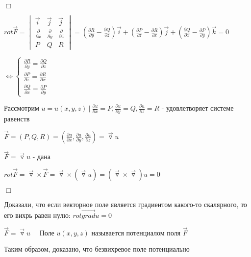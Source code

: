 \documentclass[12pt]{article}
\begin{document}
    $\Box$ \fbox{\Longrightarrow}

    $rot \overrightarrow{F} =
    \begin{vmatrix}
        \overrightarrow{i}          & \overrightarrow{j}          & \overrightarrow{j}          \\
        \frac{\partial}{\partial x} & \frac{\partial}{\partial y} & \frac{\partial}{\partial z} \\
        P & Q & R
    \end{vmatrix} = \left(\frac{\partial R}{\partial y} - \frac{\partial Q}{\partial z}\right)\overrightarrow{i} + \left(\frac{\partial P}{\partial z} - \frac{\partial R}{\partial x}\right)\overrightarrow{j} + \left(\frac{\partial Q}{\partial x} - \frac{\partial P}{\partial y}\right)\overrightarrow{k} = 0$

    $\Longleftrightarrow
    \begin{cases}
        \frac{\partial R}{\partial y} = \frac{\partial Q}{\partial z} \\
        \frac{\partial P}{\partial z} = \frac{\partial R}{\partial x} \\
        \frac{\partial Q}{\partial x} = \frac{\partial P}{\partial y}
    \end{cases}$

    Рассмотрим $u = u(x, y, z) \ | \ \frac{\partial u}{\partial x} = P, \frac{\partial u}{\partial y} = Q, \frac{\partial u}{\partial z} = R$ - удовлетворяет системе равенств

    $\overrightarrow{F} = (P, Q, R) = \left(\frac{\partial u}{\partial x}, \frac{\partial u}{\partial y}, \frac{\partial u}{\partial z}\right) = \overrightarrow{\triangledown} u$

    \fbox{\Longleftarrow} $\overrightarrow{F} = \overrightarrow{\triangledown}u$ - дана

    $rot \overrightarrow{F} = \overrightarrow{\triangledown} \times \overrightarrow{F} = \overrightarrow{\triangledown} \times (\overrightarrow{\triangledown} u) = (\overrightarrow{\triangledown} \times \overrightarrow{\triangledown}) u = 0$

    $\Box$

    \Nota Доказали, что если векторное поле является градиентом какого-то скалярного, то его вихрь равен нулю: $rot \overrightarrow{grad} u = 0$

    \Def $\overrightarrow{F} = \overrightarrow{\triangledown} u \quad$ Поле $u(x, y, z)$ называется потенциалом поля $\overrightarrow{F}$

    Таким образом, доказано, что безвихревое поле потенциально
\end{document}
